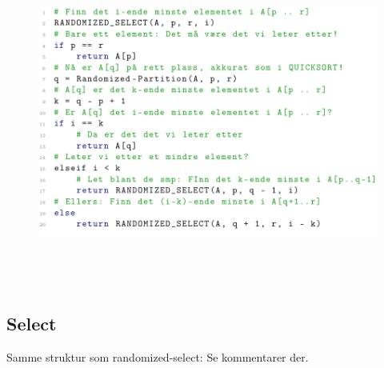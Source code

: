 \documentclass[12pt]{report}
\begin{document}
\begin{figure}[H]
	\begin{Center}
		\includegraphics[width=6.25in,height=4.25in]{./media/image178.png}
	\end{Center}
\end{figure}



\par




\newpage

\vspace{\baselineskip}\subsection*{Select}
{\fontsize{13pt}{15.6pt}\selectfont Samme struktur som randomized-select: Se kommentarer der.\par}\par



\end{document}
